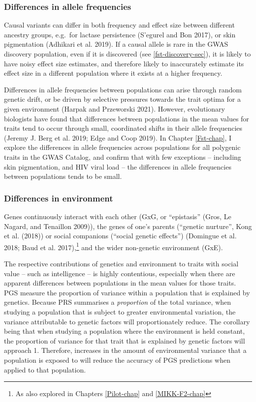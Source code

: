 \documentclass[
]{book}
\begin{document}
\hypertarget{differences-in-allele-frequencies-1}{%
\subsubsection{Differences in allele frequencies}\label{differences-in-allele-frequencies-1}}

Causal variants can differ in both frequency and effect size between different ancestry groups, e.g.~for lactase persistence (S'egurel and Bon 2017), or skin pigmentation (Adhikari et al. 2019). If a causal allele is rare in the GWAS discovery population, even if it is discovered (see \ref{fst-discovery-sec}), it is likely to have noisy effect size estimates, and therefore likely to inaccurately estimate its effect size in a different population where it exists at a higher frequency.

Differences in allele frequencies between populations can arise through random genetic drift, or be driven by selective pressures towards the trait optima for a given environment (Harpak and Przeworski 2021). However, evolutionary biologists have found that differences between populations in the mean values for traits tend to occur through small, coordinated shifts in their allele frequencies (Jeremy J. Berg et al. 2019; Edge and Coop 2019). In Chapter \ref{Fst-chap}, I explore the differences in allele frequencies across populations for all polygenic traits in the GWAS Catalog, and confirm that with few exceptions -- including skin pigmentation, and HIV viral load -- the differences in allele frequencies between populations tends to be small.

\hypertarget{fst-env-sec}{%
\subsubsection{Differences in environment}\label{fst-env-sec}}

Genes continuously interact with each other (GxG, or ``epistasis'' (Gros, Le Nagard, and Tenaillon 2009)), the genes of one's parents (``genetic nurture'', Kong et al. (2018)) or social companions (``social genetic effects'') (Domingue et al. 2018; Baud et al. 2017),\footnote{As also explored in Chapters \ref{Pilot-chap} and \ref{MIKK-F2-chap}} and the wider non-genetic environment (GxE).

The respective contributions of genetics and environment to traits with social value -- such as intelligence -- is highly contentious, especially when there are apparent differences between populations in the mean values for those traits. PGS measure the proportion of variance within a population that is explained by genetics. Because PRS summarises a \emph{proportion} of the total variance, when studying a population that is subject to greater environmental variation, the variance attributable to genetic factors will proportionately reduce. The corollary being that when studying a population where the environment is held constant, the proportion of variance for that trait that is explained by genetic factors will approach 1. Therefore, increases in the amount of environmental variance that a population is exposed to will reduce the accuracy of PGS predictions when applied to that population.
\end{document}
